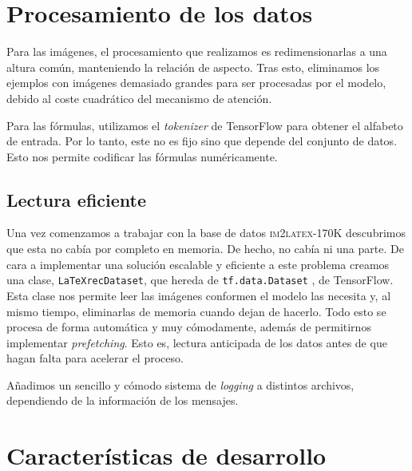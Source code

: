 \documentclass[a4paper, 20pt, dvipsnames]{article}
\begin{document}
\section{Procesamiento de los datos}

Para las imágenes, el procesamiento que realizamos es redimensionarlas a una
altura común, manteniendo la relación de aspecto. Tras esto, eliminamos los
ejemplos con imágenes demasiado grandes para ser procesadas por el modelo,
debido al coste cuadrático del mecanismo de atención.

Para las fórmulas, utilizamos el \emph{tokenizer} de TensorFlow \cite{tokenizer}
para obtener el alfabeto de entrada. Por lo tanto, este no es fijo sino que
depende del conjunto de datos. Esto nos permite codificar las fórmulas
numéricamente.


\subsection{Lectura eficiente}

Una vez comenzamos a trabajar con la base de datos \textsc{im2latex-170K}
descubrimos que esta no cabía por completo en memoria. De hecho, no cabía ni una
parte. De cara a implementar una solución escalable y eficiente a este problema
creamos una clase, \texttt{LaTeXrecDataset}, que hereda de
\texttt{tf.data.Dataset} \cite{tf_dataset}, de TensorFlow. Esta clase nos
permite leer las imágenes conformen el modelo las necesita y, al mismo tiempo,
eliminarlas de memoria cuando dejan de hacerlo. Todo esto se procesa de forma
automática y muy cómodamente, además de permitirnos implementar
\emph{prefetching}. Esto es, lectura anticipada de los datos antes de que hagan
falta para acelerar el proceso.


Añadimos un sencillo y cómodo sistema de \emph{logging} a distintos archivos,
dependiendo de la información de los
mensajes. %


\section{Características de desarrollo}

\end{document}
